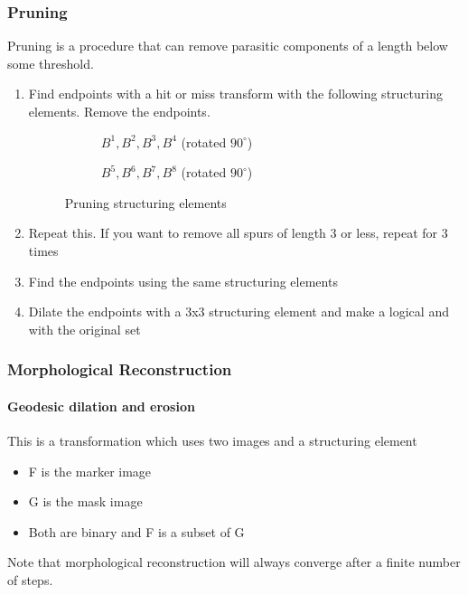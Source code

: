 \subsubsection{Pruning}
Pruning is a procedure that can remove parasitic components of a length below some threshold.\\
\begin{enumerate}
\item Find endpoints with a hit or miss transform with the following structuring elements. Remove the endpoints.
\begin{figure}[h!]
\centering
\begin{subfigure}[b]{0.45\textwidth}
\centering
{}
\caption{$B^1, B^2, B^3, B^4$ (rotated $90^\circ$)}
\end{subfigure}
\begin{subfigure}[b]{0.45\textwidth}
\centering
{}
\caption{$B^5, B^6, B^7, B^8$ (rotated $90^\circ$)}
\end{subfigure}
\caption{Pruning structuring elements}
\end{figure}
\item Repeat this. If you want to remove all spurs of length 3 or less, repeat for 3 times
\item Find the endpoints using the same structuring elements
\item Dilate the endpoints with a 3x3 structuring element and make a logical and with the original set
\end{enumerate}

\subsubsection{Morphological Reconstruction}
\paragraph{Geodesic dilation and erosion}
This is a transformation which uses two images and a structuring element
\begin{itemize}
\item F is the marker image
\item G is the mask image
\item Both are binary and F is a subset of G
\end{itemize}
Note that morphological reconstruction will always converge after a finite number of steps. \\

